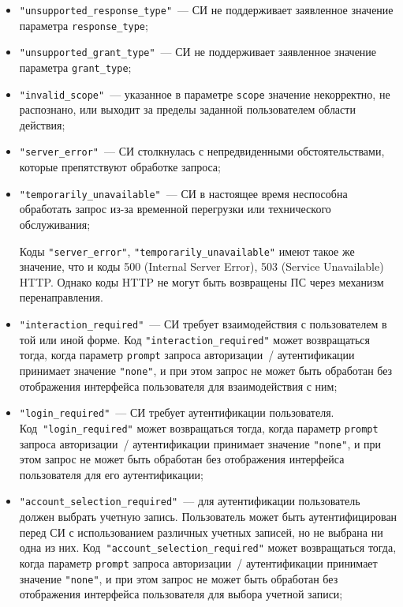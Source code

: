 \begin{itemize}
\item
\lstinline{"unsupported_response_type"}~---
СИ не поддерживает заявленное значение параметра \lstinline{response_type}; 

\item
\lstinline{"unsupported_grant_type"}~---
СИ не поддерживает заявленное значение параметра \lstinline{grant_type};

\item
\lstinline{"invalid_scope"}~---
указанное в параметре \lstinline{scope} значение некорректно, не распознано, 
или выходит за пределы заданной пользователем области действия;

\item
\lstinline{"server_error"}~---
СИ столкнулась с непредвиденными обстоятельствами, 
которые препятствуют обработке запроса;

\item
\lstinline{"temporarily_unavailable"}~---
СИ в настоящее время неспособна обработать запрос из-за временной перегрузки 
или технического обслуживания;

\begin{note*}
Коды \lstinline{"server_error"}, \lstinline{"temporarily_unavailable"} 
имеют такое же значение, что и коды 500 (Internal Server Error), 
503 (Service Unavailable) HTTP. Однако коды HTTP не могут быть возвращены  
ПС через механизм перенаправления.
\end{note*}

\item
\lstinline{"interaction_required"}~---
СИ требует взаимодействия с пользователем в той или иной форме. 
%
Код \lstinline{"interaction_required"} может возвращаться тогда, когда параметр 
\lstinline{prompt} запроса авторизации~/ аутентификации принимает значение 
\lstinline{"none"}, и при этом запрос не может быть обработан без отображения 
интерфейса пользователя для взаимодействия с ним; 

\item
\lstinline{"login_required"}~---
СИ требует аутентификации пользователя.
%
Код~\lstinline{"login_required"} может возвращаться тогда,
когда параметр \lstinline{prompt} запроса авторизации~/ аутентификации 
принимает значение \lstinline{"none"}, и при этом запрос не может быть 
обработан без отображения интерфейса пользователя для его аутентификации; 

\item
\lstinline{"account_selection_required"}~--- 
для аутентификации пользователь должен выбрать учетную запись. 
%
Пользователь может быть аутентифицирован перед СИ с использованием различных 
учетных записей, но не выбрана ни одна из них.
%
Код~\lstinline{"account_selection_required"} может возвращаться тогда, когда 
параметр \lstinline{prompt} запроса авторизации~/ аутентификации 
принимает значение \lstinline{"none"}, и при этом запрос не может быть 
обработан без отображения интерфейса пользователя для выбора учетной записи;


\end{itemize}
